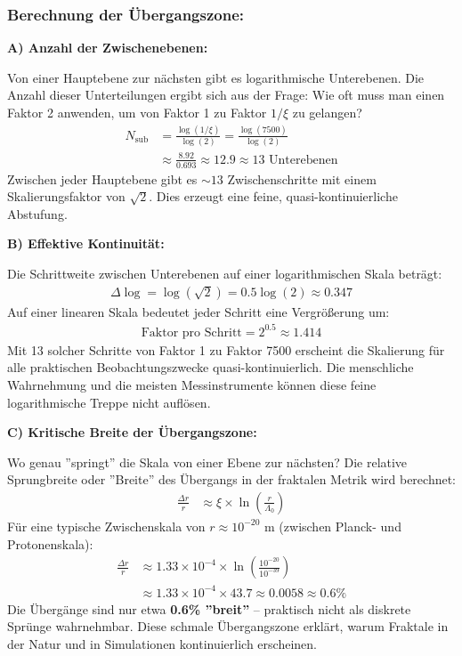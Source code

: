 \subsubsection*{Berechnung der Übergangszone:}

\textbf{A) Anzahl der Zwischenebenen:}

Von einer Hauptebene zur nächsten gibt es logarithmische Unterebenen. Die Anzahl dieser Unterteilungen ergibt sich aus der Frage: Wie oft muss man einen Faktor 2 anwenden, um von Faktor 1 zu Faktor $1/\xi$ zu gelangen?
\begin{align*}
	N_{\text{sub}} &= \frac{\log(1/\xi)}{\log(2)} = \frac{\log(7500)}{\log(2)} \\
	&\approx \frac{8.92}{0.693} \approx 12.9 \approx 13 \text{ Unterebenen}
\end{align*}
Zwischen jeder Hauptebene gibt es $\sim 13$ Zwischenschritte mit einem Skalierungsfaktor von $\sqrt{2}$. Dies erzeugt eine feine, quasi-kontinuierliche Abstufung.

\textbf{B) Effektive Kontinuität:}

Die Schrittweite zwischen Unterebenen auf einer logarithmischen Skala beträgt:
\begin{align*}
	\Delta \log = \log(\sqrt{2}) = 0.5 \log(2) \approx 0.347
\end{align*}
Auf einer linearen Skala bedeutet jeder Schritt eine Vergrößerung um:
\begin{align*}
	\text{Faktor pro Schritt} = 2^{0.5} \approx 1.414
\end{align*}
Mit 13 solcher Schritte von Faktor 1 zu Faktor 7500 erscheint die Skalierung für alle praktischen Beobachtungszwecke quasi-kontinuierlich. Die menschliche Wahrnehmung und die meisten Messinstrumente können diese feine logarithmische Treppe nicht auflösen.

\textbf{C) Kritische Breite der Übergangszone:}

Wo genau ''springt'' die Skala von einer Ebene zur nächsten? Die relative Sprungbreite oder ''Breite'' des Übergangs in der fraktalen Metrik wird berechnet:
\begin{align*}
	\frac{\Delta r}{r} &\approx \xi \times \ln\left(\frac{r}{\Lambda_0}\right)
\end{align*}
Für eine typische Zwischenskala von $r \approx 10^{-20}$ m (zwischen Planck- und Protonenskala):
\begin{align*}
	\frac{\Delta r}{r} &\approx 1.33 \times 10^{-4} \times \ln\left(\frac{10^{-20}}{10^{-39}}\right) \\
	&\approx 1.33 \times 10^{-4} \times 43.7 \approx 0.0058 \approx 0.6\%
\end{align*}
Die Übergänge sind nur etwa \textbf{0.6\% ''breit''} – praktisch nicht als diskrete Sprünge wahrnehmbar. Diese schmale Übergangszone erklärt, warum Fraktale in der Natur und in Simulationen kontinuierlich erscheinen.

